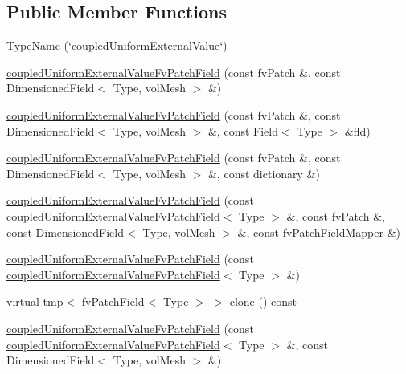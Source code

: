 \subsection*{Public Member Functions}
\begin{DoxyCompactItemize}
\item 
\hyperlink{classFoam_1_1coupledUniformExternalValueFvPatchField_af4e619c393072bbd4b214e4787b0b660}{Type\+Name} (\char`\"{}coupled\+Uniform\+External\+Value\char`\"{})
\item 
\hyperlink{classFoam_1_1coupledUniformExternalValueFvPatchField_a845efa0d3f4d6764c6feb43b38033a8f}{coupled\+Uniform\+External\+Value\+Fv\+Patch\+Field} (const fv\+Patch \&, const Dimensioned\+Field$<$ Type, vol\+Mesh $>$ \&)
\item 
\hyperlink{classFoam_1_1coupledUniformExternalValueFvPatchField_af8125abbd4a29e9a6c088a0216a487be}{coupled\+Uniform\+External\+Value\+Fv\+Patch\+Field} (const fv\+Patch \&, const Dimensioned\+Field$<$ Type, vol\+Mesh $>$ \&, const Field$<$ Type $>$ \&fld)
\item 
\hyperlink{classFoam_1_1coupledUniformExternalValueFvPatchField_a09f1116fa2e590cd114719e0306acb30}{coupled\+Uniform\+External\+Value\+Fv\+Patch\+Field} (const fv\+Patch \&, const Dimensioned\+Field$<$ Type, vol\+Mesh $>$ \&, const dictionary \&)
\item 
\hyperlink{classFoam_1_1coupledUniformExternalValueFvPatchField_ae0e4634e8b42895093a0eebe69f97a9c}{coupled\+Uniform\+External\+Value\+Fv\+Patch\+Field} (const \hyperlink{classFoam_1_1coupledUniformExternalValueFvPatchField}{coupled\+Uniform\+External\+Value\+Fv\+Patch\+Field}$<$ Type $>$ \&, const fv\+Patch \&, const Dimensioned\+Field$<$ Type, vol\+Mesh $>$ \&, const fv\+Patch\+Field\+Mapper \&)
\item 
\hyperlink{classFoam_1_1coupledUniformExternalValueFvPatchField_a14167961b3496849b324d72e82bce346}{coupled\+Uniform\+External\+Value\+Fv\+Patch\+Field} (const \hyperlink{classFoam_1_1coupledUniformExternalValueFvPatchField}{coupled\+Uniform\+External\+Value\+Fv\+Patch\+Field}$<$ Type $>$ \&)
\item 
virtual tmp$<$ fv\+Patch\+Field$<$ Type $>$ $>$ \hyperlink{classFoam_1_1coupledUniformExternalValueFvPatchField_a3b748d8418dd1e3ff70b8749bab69840}{clone} () const
\item 
\hyperlink{classFoam_1_1coupledUniformExternalValueFvPatchField_a874da7553d495122ba41b1e5dc596b3f}{coupled\+Uniform\+External\+Value\+Fv\+Patch\+Field} (const \hyperlink{classFoam_1_1coupledUniformExternalValueFvPatchField}{coupled\+Uniform\+External\+Value\+Fv\+Patch\+Field}$<$ Type $>$ \&, const Dimensioned\+Field$<$ Type, vol\+Mesh $>$ \&)

\end{DoxyCompactItemize}
